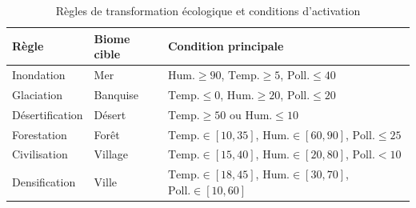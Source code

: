 \begin{table}[htbp]
  \centering
  \begin{tabular}{llp{7cm}}
    \toprule
    \textbf{Règle} & \textbf{Biome cible} & \textbf{Condition principale} \\
    \midrule
    Inondation      & Mer      & $\text{Hum.} \geq 90$, $\text{Temp.} \geq 5$, $\text{Poll.} \leq 40$ \\
    Glaciation      & Banquise & $\text{Temp.} \leq 0$, $\text{Hum.} \geq 20$, $\text{Poll.} \leq 20$ \\
    Désertification & Désert   & $\text{Temp.} \geq 50$ ou $\text{Hum.} \leq 10$ \\
    Forestation     & Forêt    & $\text{Temp.} \in [10, 35]$, $\text{Hum.} \in [60, 90]$, $\text{Poll.} \leq 25$ \\
    Civilisation    & Village  & $\text{Temp.} \in [15, 40]$, $\text{Hum.} \in [20, 80]$, $\text{Poll.} < 10$ \\
    Densification   & Ville    & $\text{Temp.} \in [18, 45]$, $\text{Hum.} \in [30, 70]$, $\text{Poll.} \in [10, 60]$ \\
    \bottomrule
  \end{tabular}
  \caption{Règles de transformation écologique et conditions d'activation}
  \label{tab:transformations}
\end{table}

